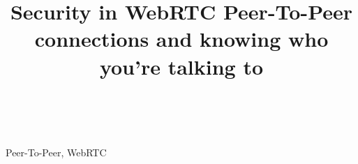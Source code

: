 \documentclass[conference]{IEEEtran}
\begin{document}
\title{Security in WebRTC Peer-To-Peer connections and knowing who you're talking to\\
}

\author{
 \\
\textit{}
}

\maketitle

\begin{abstract}
\end{abstract}

\begin{IEEEkeywords}
Peer-To-Peer, WebRTC
\end{IEEEkeywords}
\end{document}
